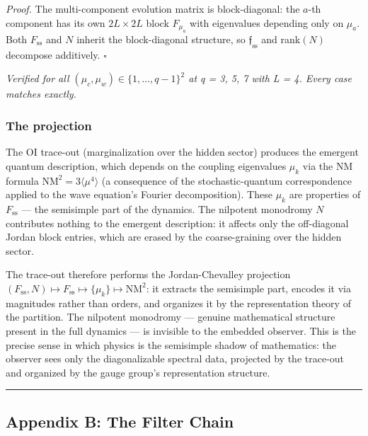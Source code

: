 \documentclass[
  11pt,
]{article}
\begin{document}
\emph{Proof.} The multi-component evolution matrix is block-diagonal:
the \(a\)-th component has its own \(2L \times 2L\) block \(F_{\mu_a}\)
with eigenvalues depending only on \(\mu_a\). Both \(F_{\mathrm{ss}}\)
and \(N\) inherit the block-diagonal structure, so
\(\mathfrak{f}_{\mathrm{ss}}\) and rank\((N)\) decompose additively.
\(\square\)

\emph{Verified for all \((\mu_c, \mu_w) \in \{1, \ldots, q-1\}^2\) at q
= 3, 5, 7 with L = 4. Every case matches exactly.}

\hypertarget{the-projection}{%
\subsubsection{The projection}\label{the-projection}}

The OI trace-out (marginalization over the hidden sector) produces the
emergent quantum description, which depends on the coupling eigenvalues
\(\mu_k\) via the NM formula \(\mathrm{NM}^2 = 3\langle\mu^4\rangle\) (a
consequence of the stochastic-quantum correspondence applied to the wave
equation's Fourier decomposition). These \(\mu_k\) are properties of
\(F_{\mathrm{ss}}\) --- the semisimple part of the dynamics. The
nilpotent monodromy \(N\) contributes nothing to the emergent
description: it affects only the off-diagonal Jordan block entries,
which are erased by the coarse-graining over the hidden sector.

The trace-out therefore performs the Jordan-Chevalley projection
\((F_{\mathrm{ss}}, N) \mapsto F_{\mathrm{ss}} \mapsto \{\mu_k\} \mapsto \mathrm{NM}^2\):
it extracts the semisimple part, encodes it via magnitudes rather than
orders, and organizes it by the representation theory of the partition.
The nilpotent monodromy --- genuine mathematical structure present in
the full dynamics --- is invisible to the embedded observer. This is the
precise sense in which physics is the semisimple shadow of mathematics:
the observer sees only the diagonalizable spectral data, projected by
the trace-out and organized by the gauge group's representation
structure.

\begin{center}\rule{0.5\linewidth}{0.5pt}\end{center}

\hypertarget{appendix-b-the-filter-chain}{%
\subsection{Appendix B: The Filter
Chain}\label{appendix-b-the-filter-chain}}
\end{document}
